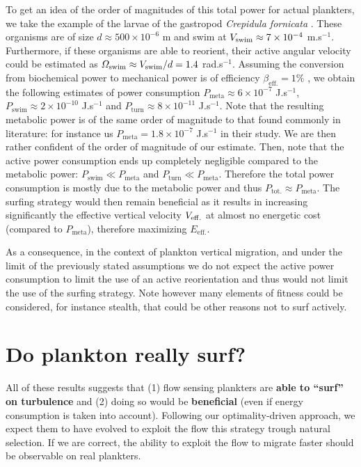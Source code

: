To get an idea of the order of magnitudes of this total power for actual plankters, we take the example of the larvae of the gastropod \textit{Crepidula fornicata} \citep{dibenedetto2022responding}.
These organisms are of size $d \approx 500 \times 10^{-6}$ m and swim at $V_{\mathrm{swim}} \approx 7 \times 10^{-4}$ m.s$^{-1}$.
Furthermore, if these organisms are able to reorient, their active angular velocity could be estimated as $\varOmega_{\mathrm{swim}} \approx V_{\mathrm{swim}} / d = 1.4$ rad.s$^{-1}$.
Assuming the conversion from biochemical power to mechanical power is of efficiency $\beta_{\mathrm{eff.}} = 1\%$ , we obtain the following estimates of power consumption $P_{\mathrm{meta}} \approx 6 \times 10^{-7}$ J.s$^{-1}$, $P_{\mathrm{swim}} \approx 2 \times 10^{-10}$ J.s$^{-1}$ and $P_{\mathrm{turn}} \approx 8 \times 10^{-11}$ J.s$^{-1}$.
Note that the resulting metabolic power is of the same order of magnitude to that found commonly in literature: for instance \citet{visser2009swimming} us $P_{\mathrm{meta}} = 1.8 \times 10^{-7}$ J.s$^{-1}$ in their study.
We are then rather confident of the order of magnitude of our estimate.
Then, note that the active power consumption ends up completely negligible compared to the metabolic power: $P_{\mathrm{swim}} \ll P_{\mathrm{meta}}$ and $P_{\mathrm{turn}} \ll P_{\mathrm{meta}}$.
Therefore the total power consumption is mostly due to the metabolic power and thus $P_{\mathrm{tot.}} \approx P_{\mathrm{meta}}$.
The surfing strategy would then remain beneficial as it results in increasing significantly the effective vertical velocity $V_{\mathrm{eff.}}$ at almost no energetic cost (compared to $P_{\mathrm{meta}}$), therefore maximizing $E_{\mathrm{eff.}}$.

As a consequence, in the context of plankton vertical migration, and under the limit of the previously stated assumptions we do not expect the active power consumption to limit the use of an active reorientation and thus would not limit the use of the surfing strategy.
Note however many elements of fitness could be considered, for instance stealth, that could be other reasons not to surf actively.







\section{Do plankton really surf?}\label{sec:do_they_surf}

All of these results suggests that (1) flow sensing plankters are \textbf{able to ``surf'' on turbulence} and (2) doing so would be \textbf{beneficial} (even if energy consumption is taken into account).
Following our optimality-driven approach, we expect them to have evolved to exploit the flow this strategy trough natural selection.
If we are correct, the ability to exploit the flow to migrate faster should be observable on real plankters.

